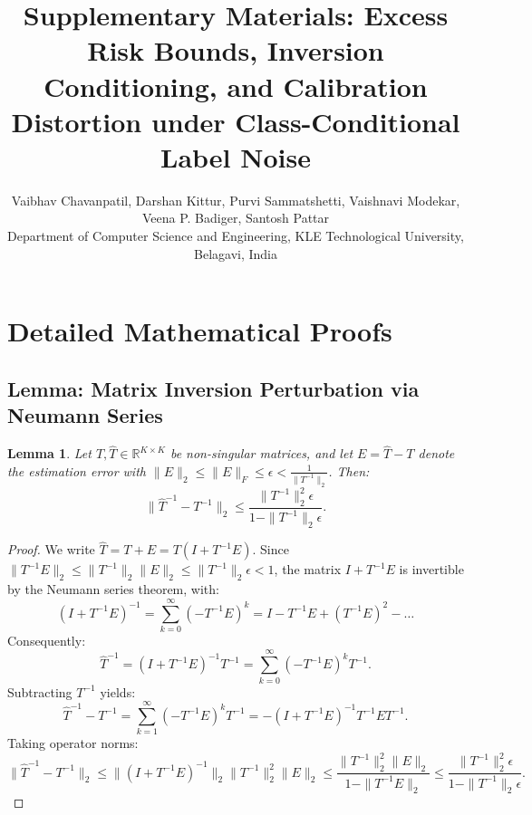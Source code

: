 \documentclass[11pt,onecolumn]{article}
\title{\textbf{Supplementary Materials: Excess Risk Bounds, Inversion Conditioning, and Calibration Distortion under Class-Conditional Label Noise}}
\author{Vaibhav Chavanpatil, Darshan Kittur, Purvi Sammatshetti, Vaishnavi Modekar, Veena P. Badiger, Santosh Pattar \\
Department of Computer Science and Engineering, KLE Technological University, Belagavi, India}
\date{}
\newtheorem{lemma}{Lemma}
\begin{document}
\maketitle

\tableofcontents
\newpage

\section{Detailed Mathematical Proofs}

\subsection{Lemma: Matrix Inversion Perturbation via Neumann Series}
\begin{lemma}
Let $T, \hat{T} \in \mathbb{R}^{K \times K}$ be non-singular matrices, and let $E = \hat{T} - T$ denote the estimation error with $\|E\|_2 \le \|E\|_F \le \epsilon < \frac{1}{\|T^{-1}\|_2}$. Then:
\begin{equation}
\|\hat{T}^{-1} - T^{-1}\|_2 \le \frac{\|T^{-1}\|_2^2 \epsilon}{1 - \|T^{-1}\|_2 \epsilon}.
\end{equation}
\end{lemma}
\begin{proof}
We write $\hat{T} = T + E = T (I + T^{-1} E)$. Since $\|T^{-1} E\|_2 \le \|T^{-1}\|_2 \|E\|_2 \le \|T^{-1}\|_2 \epsilon < 1$, the matrix $I + T^{-1} E$ is invertible by the Neumann series theorem, with:
\begin{equation}
(I + T^{-1} E)^{-1} = \sum_{k=0}^\infty (-T^{-1} E)^k = I - T^{-1} E + (T^{-1} E)^2 - \dots
\end{equation}
Consequently:
\begin{equation}
\hat{T}^{-1} = (I + T^{-1} E)^{-1} T^{-1} = \sum_{k=0}^\infty (-T^{-1} E)^k T^{-1}.
\end{equation}
Subtracting $T^{-1}$ yields:
\begin{equation}
\hat{T}^{-1} - T^{-1} = \sum_{k=1}^\infty (-T^{-1} E)^k T^{-1} = - (I + T^{-1} E)^{-1} T^{-1} E T^{-1}.
\end{equation}
Taking operator norms:
\begin{equation}
\|\hat{T}^{-1} - T^{-1}\|_2 \le \|(I + T^{-1} E)^{-1}\|_2 \|T^{-1}\|_2^2 \|E\|_2 \le \frac{\|T^{-1}\|_2^2 \|E\|_2}{1 - \|T^{-1} E\|_2} \le \frac{\|T^{-1}\|_2^2 \epsilon}{1 - \|T^{-1}\|_2 \epsilon}.
\end{equation}
\end{proof}
\end{document}
